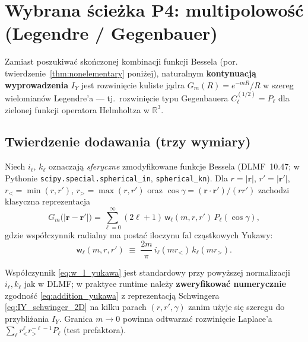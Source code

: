 
\section{Wybrana \'{s}cie\.{z}ka P4: multipolowo\'s\'c (Legendre / Gegenbauer)}
\label{sec:p4_multipole_gegenbauer}

Zamiast poszukiwa\'c sko\'nczonej kombinacji funkcji Bessela (por.
twierdzenie~\ref{thm:nonelementary} poni\.{z}ej), naturalnym \textbf{kontynuacj\k{a}
wyprowadzenia} $I_Y$ jest rozwini\k{e}cie kuliste j\k{a}dra
$G_m(R)=e^{-mR}/R$ w szereg wielomian\'ow Legendre'a --- tj.\ rozwini\k{e}cie
typu Gegenbauera $C_\ell^{(1/2)}=P_\ell$ dla zielonej funkcji operatora
Helmholtza w $\mathbb{R}^3$.

\subsection{Twierdzenie dodawania (trzy wymiary)}

Niech $i_\ell,\,k_\ell$ oznaczaj\k{a} \emph{sferyczne} zmodyfikowane funkcje Bessela
(DLMF~10.47; w Pythonie \texttt{scipy.special.spherical\_in},
\texttt{spherical\_kn}). Dla $r=|\mathbf{r}|$, $r'=|\mathbf{r}'|$,
$r_<\!=\min(r,r')$, $r_>\!=\max(r,r')$ oraz
$\cos\gamma=(\mathbf{r}\cdot\mathbf{r}')/(rr')$ zachodzi klasyczna reprezentacja
\begin{equation}
\label{eq:addition_yukawa}
G_m\bigl(|\mathbf{r}-\mathbf{r}'|\bigr)
=
\sum_{\ell=0}^{\infty} (2\ell+1)\,
\mathsf{w}_\ell(m,r,r')\,
P_\ell(\cos\gamma),
\end{equation}
gdzie wsp\'o\l{}czynnik radialny ma posta\'c iloczynu fal cz\k{a}stkowych Yukawy:
\begin{equation}
\label{eq:w_l_yukawa}
\mathsf{w}_\ell(m,r,r')
\;\equiv\;
\frac{2m}{\pi}\,
i_\ell(m r_<)\, k_\ell(m r_>).
\end{equation}

\begin{remark}
Wsp\'o\l{}czynnik \eqref{eq:w_l_yukawa} jest standardowy przy powy\.{z}szej
normalizacji $i_\ell,k_\ell$ jak w DLMF; w praktyce runtime nale\.{z}y
\textbf{zweryfikowa\'c numerycznie} zgodno\'s\'c \eqref{eq:addition_yukawa} z
reprezentacj\k{a} Schwingera \eqref{eq:IY_schwinger_2D} na kilku parach
$(r,r',\gamma)$ zanim u\.{z}yje si\k{e} szeregu do przybli\.{z}ania $I_Y$.
Granica $m\to0$ powinna odtwarza\'c rozwini\k{e}cie Laplace'a
$\sum_\ell r_<^\ell r_>^{-\ell-1}P_\ell$ (test prefaktora).
\end{remark}

